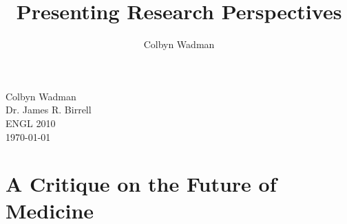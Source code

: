 \documentclass[12pt]{article}
\title{Presenting Research Perspectives}
\author{Colbyn Wadman}
\begin{document}
\begin{flushleft}

Colbyn Wadman\\
Dr. James R. Birrell\\
ENGL 2010\\
\today\\
\section*{\centering A Critique on the Future of Medicine}
\setcounter{section}{1}

\setlength{\parindent}{0.5in} 








\end{flushleft}
\end{document}
